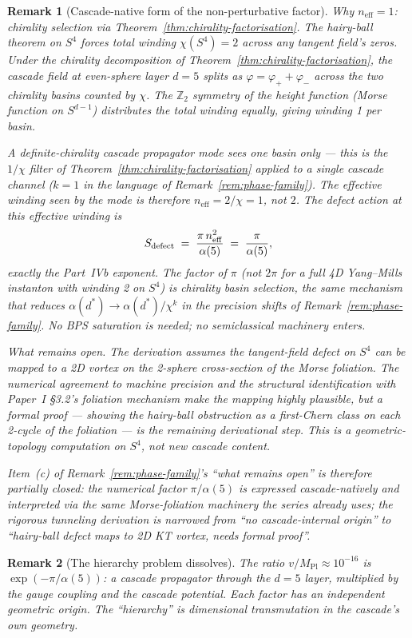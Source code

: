 \documentclass[12pt,a4paper]{article}
\newtheorem*{remark}{Remark}
\begin{document}
\begin{remark}[Cascade-native form of the non-perturbative factor]
\emph{Why $n_{\mathrm{eff}} = 1$: chirality selection via
Theorem~\ref{thm:chirality-factorisation}.}
The hairy-ball theorem on $S^4$ forces total winding $\chi(S^4) = 2$
across any tangent field's zeros. Under the chirality decomposition of
Theorem~\ref{thm:chirality-factorisation}, the cascade field at even-sphere
layer $d = 5$ splits as $\varphi = \varphi_+ + \varphi_-$ across the two
chirality basins counted by $\chi$. The $\mathbb{Z}_2$ symmetry of the
height function (Morse function on $S^{d-1}$) distributes the total winding
equally, giving winding 1 per basin.

A definite-chirality cascade propagator mode sees one basin only --- this
is the $1/\chi$ filter of Theorem~\ref{thm:chirality-factorisation} applied
to a single cascade channel ($k = 1$ in the language of
Remark~\ref{rem:phase-family}). The effective winding seen by the mode is
therefore $n_{\mathrm{eff}} = 2/\chi = 1$, not $2$. The defect action at
this effective winding is
\[
S_{\rm defect} \;=\; \frac{\pi\,n_{\mathrm{eff}}^2}{\alpha(5)}
\;=\; \frac{\pi}{\alpha(5)},
\]
exactly the Part~IVb exponent. The factor of $\pi$ (not $2\pi$ for a
full 4D Yang--Mills instanton with winding 2 on $S^4$) is
\emph{chirality basin selection}, the same mechanism that reduces
$\alpha(d^*) \to \alpha(d^*)/\chi^k$ in the precision shifts of
Remark~\ref{rem:phase-family}. No BPS saturation is needed; no
semiclassical machinery enters.

\emph{What remains open.}
The derivation assumes the tangent-field defect on $S^4$ can be mapped
to a 2D vortex on the 2-sphere cross-section of the Morse foliation.
The numerical agreement to machine precision and the structural
identification with Paper~I \S3.2's foliation mechanism make the mapping
highly plausible, but a formal proof --- showing the hairy-ball
obstruction as a first-Chern class on each 2-cycle of the foliation ---
is the remaining derivational step. This is a geometric-topology
computation on $S^4$, not new cascade content.

Item~(c) of Remark~\ref{rem:phase-family}'s ``what remains open'' is
therefore partially closed: the numerical factor $\pi/\alpha(5)$ is
expressed cascade-natively and interpreted via the same Morse-foliation
machinery the series already uses; the rigorous tunneling derivation is
narrowed from ``no cascade-internal origin'' to ``hairy-ball defect maps
to 2D KT vortex, needs formal proof''.
\end{remark}

\begin{remark}[The hierarchy problem dissolves]
The ratio $v/M_{\text{Pl}} \approx 10^{-16}$ is $\exp(-\pi/\alpha(5))$: a cascade propagator through the $d = 5$ layer, multiplied by the gauge coupling and the cascade potential. Each factor has an independent geometric origin. The ``hierarchy'' is dimensional transmutation in the cascade's own geometry.
\end{remark}
\end{document}
